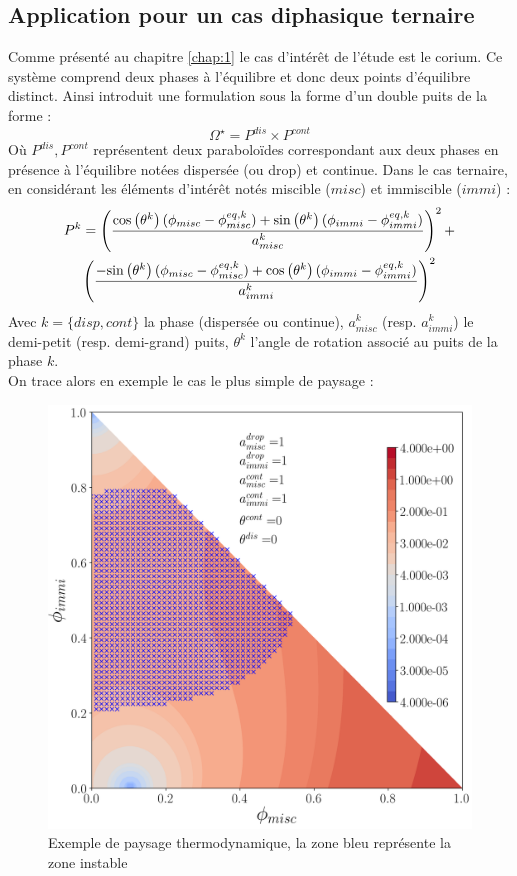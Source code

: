 	\subsection{Application pour un cas diphasique ternaire}
Comme présenté au chapitre \ref{chap:1} le cas d'intérêt de l'étude est le corium. Ce système comprend deux phases à l'équilibre et donc deux points d'équilibre distinct.  Ainsi \cite{rasolofomanana_numerical_nodate} introduit une formulation sous la forme d'un double puits de la forme :
\begin{equation}\label{double_puit}
	\Omega^{\star}  = P^{dis} \times P^{cont}
\end{equation}
Où $P^{dis}, P^{cont}$ représentent deux paraboloïdes correspondant aux deux phases en présence à l'équilibre notées dispersée (ou drop) et continue. Dans le cas ternaire, en considérant les éléments d'intérêt notés miscible ($misc$)  et immiscible ($immi$)  : 
\begin{multline}
P^{k}=\left(\frac{\text{cos}\left(\theta^{k}\right)(\phi_{misc}-\phi_{misc}^{eq,k}) + \text{sin}\left(\theta^{k}\right)(\phi_{immi}-\phi_{immi}^{eq,k})}{a_{misc}^{k}}\right)^{2}+\\ \left(\frac{-\text{sin}\left(\theta^{k}\right)(\phi_{misc}-\phi_{misc}^{eq,k}) + \text{cos}\left(\theta^{k}\right)(\phi_{immi}-\phi_{immi}^{eq,k})}{a_{immi}^{k}}\right)^{2}
\label{eq:paraboloid_general_}
\end{multline}
Avec $k = \{disp,cont\}$ la phase (dispersée ou continue), $a_{misc}^k$ (resp. $a_{immi}^k$) le demi-petit (resp. demi-grand) puits, $\theta^k$ l'angle de rotation associé au puits de la phase $k$.\\
On trace alors en exemple le cas le plus simple de paysage :
\begin{figure}[H]
	\centering
	\includegraphics[width=0.6\linewidth]{figure/landscape}
	\caption{Exemple de paysage thermodynamique, la zone bleu représente la zone instable}
	\label{fig:landscape}
\end{figure}
